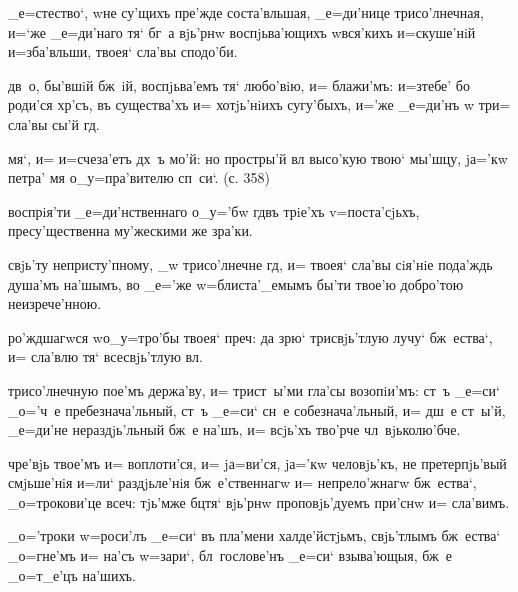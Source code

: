 _е=стество`, w\т не су'щихъ пре'жде соста'вльшая, 
_е=ди'нице трисо'лнечная, и=`же _е=ди'наго тя` бг~а 
вjь'рнw воспjьва'ющихъ w\т вся'кихъ и=скуше'нiй 
и=зба'вльши, твоея` сла'вы сподо'би.

дв~о, бы'вшiй бж~iй, воспjьва'емъ тя` любо'вiю, и= 
блажи'мъ: и=з\ъ тебе' бо роди'ся хр'съ, въ 
существа'хъ и= хотjь'нiихъ сугу'быхъ, и='же _е=ди'нъ w\т 
тр и= сла'вы сы'й гд.


мя`, и= и=счеза'етъ дх~ъ мо'й: но простры'й вл 
высо'кую твою` мы'шцу, jа='кw петра' мя о_у=пра'вителю 
сп~си`. (с. 358)

воспрiя'ти _е=ди'нственнаго о_у='бw гд въ трiе'хъ 
v=поста'сjьхъ, пресу'щественна му'жескими же зра'ки. 

свjь'ту непристу'пному, _w трисо'лнечне гд, и= твоея` 
сла'вы сiя'нiе пода'ждь душа'мъ на'шымъ, во _е='же 
w=блиста'_емымъ бы'ти твое'ю добро'тою неизрече'нною.

ро'ждшагwся w\т о_у=тро'бы твоея` преч: да зрю` 
трисвjь'тлую лучу` бж~ества`, и= сла'влю тя` всесвjь'тлую 
вл.




трисо'лнечную пое'мъ держа'ву, и= трист~ы'ми гла'сы 
возопiи'мъ: ст~ъ _е=си` _о='ч~е пребезнача'льный, ст~ъ 
_е=си` сн~е собезнача'льный, и= дш~е ст~ы'й, _е=ди'не 
нераздjь'льный бж~е на'шъ, и= всjь'хъ тво'рче 
чл~вjьколю'бче.


чре'вjь твое'мъ и= воплоти'ся, и= jа=ви'ся, jа='кw 
человjь'къ, не претерпjь'вый смjьше'нiя и=ли` 
раздjьле'нiя бж~е'ственнагw и= непрело'жнагw бж~ества`, 
_о=трокови'це всеч: тjь'мже бц тя` вjь'рнw 
проповjь'дуемъ при'снw и= сла'вимъ.


_о='троки w=роси'лъ _е=си` въ пла'мени халде'йстjьмъ, 
свjь'тлымъ бж~ества` _о=гне'мъ и= на'съ w=зари`, 
бл~гослове'нъ _е=си` взыва'ющыя, бж~е _о=т_е'цъ на'шихъ.

